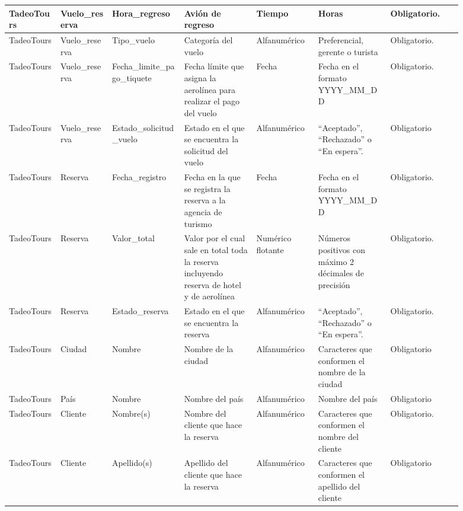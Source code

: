 \documentclass{article}
\begin{document}
\begin{landscape}
\begin{longtable}{|C{0.102\linewidth}|C{0.102\linewidth}|C{0.142\linewidth}|C{0.142\linewidth}|C{0.122\linewidth}|C{0.142\linewidth}|C{0.142\linewidth}|}
TadeoTours & Vuelo\_reserva & Hora\_regreso & Avión de regreso & Tiempo & Horas & Obligatorio. \\ \hline

TadeoTours & Vuelo\_reserva & Tipo\_vuelo & Categoría del vuelo & Alfanumérico & Preferencial, gerente o turista & Obligatorio. \\ \hline

TadeoTours & Vuelo\_reserva & Fecha\_limite\_pago\_tiquete & Fecha límite que asigna la aerolínea para realizar el pago del vuelo & Fecha & Fecha en el formato YYYY\_MM\_DD & Obligatorio. \\ \hline

TadeoTours & Vuelo\_reserva & Estado\_solicitud\_vuelo & Estado en el que se encuentra la solicitud del vuelo & Alfanumérico & ``Aceptado'', ``Rechazado'' o ``En espera''. & Obligatorio \\ \hline

TadeoTours & Reserva & Fecha\_registro & Fecha en la que se registra la reserva a la agencia de turismo & Fecha & Fecha en el formato YYYY\_MM\_DD & Obligatorio. \\ \hline

TadeoTours & Reserva & Valor\_total & Valor por el cual sale en total toda la reserva incluyendo reserva de hotel y de aerolínea & Numérico flotante & Números positivos con máximo 2 décimales de precisión & Obligatorio. \\ \hline

TadeoTours & Reserva & Estado\_reserva & Estado en el que se encuentra la reserva & Alfanumérico & ``Aceptado'', ``Rechazado'' o ``En espera''. & Obligatorio. \\ \hline

TadeoTours & Ciudad & Nombre & Nombre de la ciudad & Alfanumérico & Caracteres que conformen el nombre de la ciudad & Obligatorio \\ \hline

TadeoTours & País & Nombre & Nombre del país & Alfanumérico & Nombre del país & Obligatorio \\ \hline

TadeoTours & Cliente & Nombre(s) & Nombre del cliente que hace la reserva & Alfanumérico & Caracteres que conformen el nombre del cliente & Obligatorio. \\ \hline

TadeoTours & Cliente & Apellido(s) & Apellido del cliente que hace la reserva & Alfanumérico & Caracteres que conformen el apellido del cliente & Obligatorio \\ \hline


\end{longtable}
\end{landscape}
\end{document}
